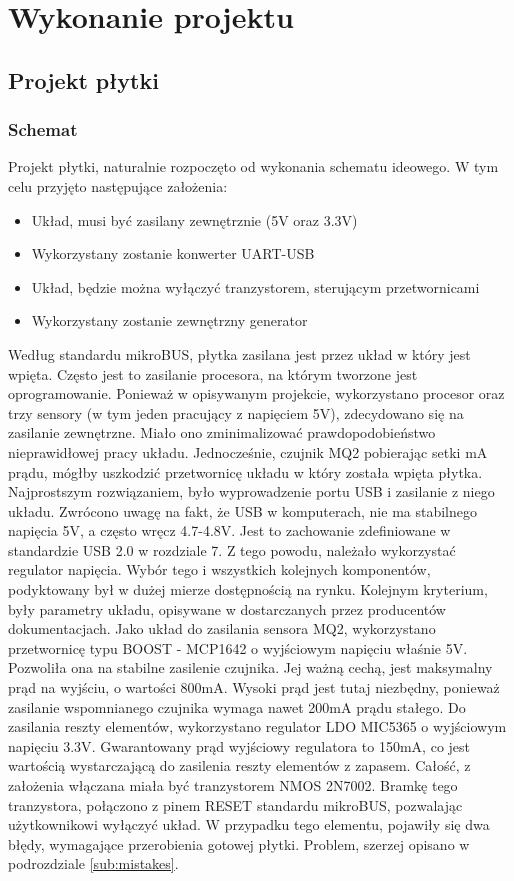 \chapter{Wykonanie projektu}
\label{cha:course}

\section{Projekt płytki}
\subsection{Schemat}
Projekt płytki, naturalnie rozpoczęto od wykonania schematu ideowego. W tym celu przyjęto następujące założenia:
\begin{itemize}
    \item Układ, musi być zasilany zewnętrznie (5V oraz 3.3V)
    \item Wykorzystany zostanie konwerter UART-USB
    \item Układ, będzie można wyłączyć tranzystorem, sterującym przetwornicami
    \item Wykorzystany zostanie zewnętrzny generator
\end{itemize}
Według standardu mikroBUS\texttrademark, płytka zasilana jest przez układ w który jest wpięta. Często jest to zasilanie procesora, na którym tworzone jest oprogramowanie. Ponieważ w opisywanym projekcie, wykorzystano procesor oraz trzy sensory (w tym jeden pracujący z napięciem 5V), zdecydowano się na zasilanie zewnętrzne. Miało ono zminimalizować prawdopodobieństwo nieprawidłowej pracy układu. Jednocześnie, czujnik MQ2 pobierając setki mA prądu, mógłby uszkodzić przetwornicę układu w który została wpięta płytka. Najprostszym rozwiązaniem, było wyprowadzenie portu USB i zasilanie z niego układu. Zwrócono uwagę na fakt, że USB w komputerach, nie ma stabilnego napięcia 5V, a często wręcz 4.7-4.8V. Jest to zachowanie zdefiniowane w standardzie USB 2.0 \cite{usb_specification} w rozdziale 7. Z tego powodu, należało wykorzystać regulator napięcia. \newline Wybór tego i wszystkich kolejnych komponentów, podyktowany był w dużej mierze dostępnością na rynku. Kolejnym kryterium, były parametry układu, opisywane w dostarczanych przez producentów dokumentacjach. Jako układ do zasilania sensora MQ2, wykorzystano przetwornicę typu BOOST - MCP1642 o wyjściowym napięciu właśnie 5V. Pozwoliła ona na stabilne zasilenie czujnika. Jej ważną cechą, jest maksymalny prąd na wyjściu, o wartości 800mA\cite{mq2_datasheet}. Wysoki prąd jest tutaj niezbędny, ponieważ zasilanie wspomnianego czujnika wymaga nawet 200mA prądu stałego. Do zasilania reszty elementów, wykorzystano regulator LDO  MIC5365 o wyjściowym napięciu 3.3V\cite{mic_datasheet}. Gwarantowany prąd wyjściowy regulatora to 150mA, co jest wartością wystarczającą do zasilenia reszty elementów z zapasem. Całość, z założenia włączana miała być tranzystorem NMOS 2N7002. Bramkę tego tranzystora, połączono z pinem RESET standardu mikroBUS\texttrademark, pozwalając użytkownikowi wyłączyć układ. W przypadku tego elementu, pojawiły się dwa błędy, wymagające przerobienia gotowej płytki. Problem, szerzej opisano w podrozdziale \ref{sub:mistakes}. \newline
